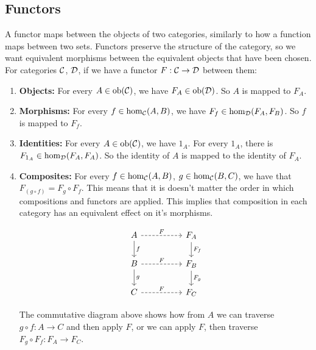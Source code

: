 \documentclass[10pt,a4paper,reqno]{amsart}
\numberwithin{figure}{section}
\begin{document}
\subsection{Functors}

A functor maps between the objects of two categories, similarly to how a function maps between two sets.
Functors preserve the structure of the category, so we want equivalent morphisms between the equivalent objects that have been chosen.
For categories $\mathcal{C}$, $\mathcal{D}$, if we have a functor $F: \mathcal{C}\to\mathcal{D}$ between them:
\begin{enumerate}
        \item \textbf{Objects:} For every $A\in\operatorname{ob}(\mathcal{C})$, we have $F_A\in\operatorname{ob}(\mathcal{D})$.
        So $A$ is mapped to $F_A$.

        \item \textbf{Morphisms:} For every $f\in\hom_{\mathcal{C}}(A,B)$, we have $F_f\in\hom_{\mathcal{D}}(F_A,F_B)$.
        So $f$ is mapped to $F_f$.

        \item \textbf{Identities:} For every $A\in\operatorname{ob}(\mathcal{C})$, we have $1_A$. For every $1_A$, there is $F_{1_A}\in\hom_{\mathcal{D}}(F_A,F_A)$.
        So the identity of $A$ is mapped to the identity of $F_A$.

        \item \textbf{Composites:} For every $f\in\hom_{\mathcal{C}}(A,B)$, $g\in\hom_{\mathcal{C}}(B,C)$, we have that $F_{(g\circ f)} = F_g\circ F_f$.
        This means that it is doesn't matter the order in which compositions and functors are applied.
        This implies that composition in each category has an equivalent effect on it's morphisms.
        \begin{figure}[H]
        \begin{equation}
        \begin{tikzcd}[column sep=huge]
                A \ar[r,"F",dashrightarrow] \ar[d,"f"] & F_A \ar[d,"F_f"]\\
                B \ar[r,"F",dashrightarrow] \ar[d,"g"] & F_B \ar[d,"F_g"]\\
                C \ar[r,"F",dashrightarrow] & F_C
        \end{tikzcd}
        \end{equation}
        \caption{}
        \end{figure}
        The commutative diagram above shows how from $A$ we can traverse $g\circ f: A\to C$ and then apply $F$,
        or we can apply $F$, then traverse $F_g\circ F_f: F_A\to F_C$.
\end{enumerate}
\end{document}
